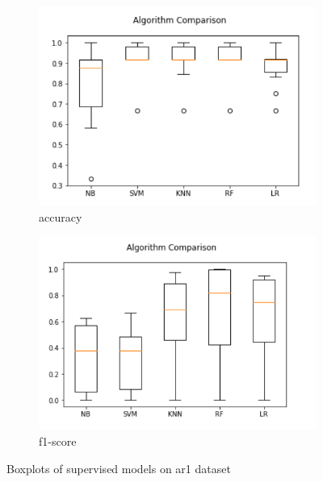 \begin{figure}[h!]
  \centering
  \begin{subfigure}[b]{0.4\linewidth}
    \includegraphics[width=\linewidth]{report/ar1.png}
    \caption{accuracy}
  \end{subfigure}
  \begin{subfigure}[b]{0.4\linewidth}
    \includegraphics[width=\linewidth]{report/ar1_f.png}
    \caption{f1-score}
  \end{subfigure}
  \caption{Boxplots of supervised models on ar1 dataset}
\end{figure}

